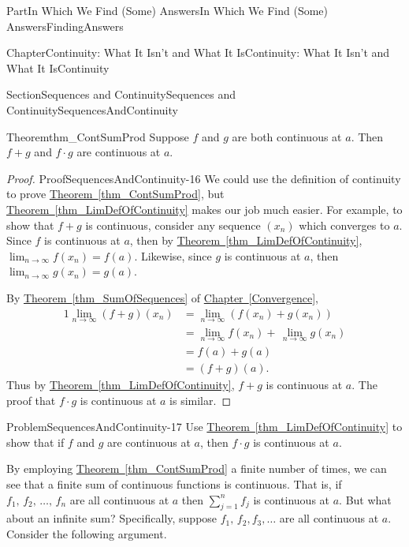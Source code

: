 \documentclass[oneside,10pt,]{book}
\newcommand{\xreffont}{\relax}
\numberwithin{equation}{part}
\newcommand{\amp}{&}
\begin{document}
\begin{partptx}{Part}{In Which We Find (Some) Answers}{}{In Which We Find (Some) Answers}{}{}{FindingAnswers}
\begin{chapterptx}{Chapter}{Continuity: What It Isn't and What It Is}{}{Continuity: What It Isn't and What It Is}{}{}{Continuity}
\begin{sectionptx}{Section}{Sequences and Continuity}{}{Sequences and Continuity}{}{}{SequencesAndContinuity}
\begin{theorem}{Theorem}{}{}{thm_ContSumProd}
 Suppose \(f\) and \(g\) are both continuous at \(a\). Then \(f+g\) and \(f\cdot g\) are continuous at \(a\).%
\end{theorem}
\begin{proof}{Proof}{}{SequencesAndContinuity-16}
We could use the definition of continuity to prove \hyperref[thm_ContSumProd]{Theorem~{\xreffont\ref{thm_ContSumProd}}}, but \hyperref[thm_LimDefOfContinuity]{Theorem~{\xreffont\ref{thm_LimDefOfContinuity}}} makes our job much easier.  For example, to show that \(f+g\) is continuous, consider any sequence \(\left(x_n\right)\) which converges to \(a\).  Since \(f\) is continuous at \(a\), then by \hyperref[thm_LimDefOfContinuity]{Theorem~{\xreffont\ref{thm_LimDefOfContinuity}}}, \(\lim_{n\rightarrow\infty}f(x_n)=f(a)\).  Likewise, since \(g\) is continuous at \(a\), then \(\lim_{n\rightarrow\infty}g(x_n)=g(a)\).%
\par
By \hyperref[thm_SumOfSequences]{Theorem~{\xreffont\ref{thm_SumOfSequences}}} of \hyperref[Convergence]{Chapter~{\xreffont\ref{Convergence}}},\(\)%
\begin{alignat*}{1}
\lim_{n\rightarrow\infty}(f+g)(x_n)\amp=\lim_{n\rightarrow\infty} \left(f(x_n)+g(x_n)\right)\\
\amp =\lim_{n\rightarrow\infty}f(x_n)+\,\lim_{n \rightarrow\infty}g(x_n)\\
\amp =f(a)+g(a)\\
\amp =(f+g)(a).
\end{alignat*}
Thus by \hyperref[thm_LimDefOfContinuity]{Theorem~{\xreffont\ref{thm_LimDefOfContinuity}}}, \(f+g\) is continuous at \(a\).  The proof that \(f\cdot g\) is continuous at \(a\) is similar.%
\end{proof}
\begin{problem}{Problem}{}{SequencesAndContinuity-17}%
Use \hyperref[thm_LimDefOfContinuity]{Theorem~{\xreffont\ref{thm_LimDefOfContinuity}}} to show that if \(f\) and \(g\) are continuous at \(a\), then \(f\cdot g\) is continuous at \(a\).%
\end{problem}
By employing \hyperref[thm_ContSumProd]{Theorem~{\xreffont\ref{thm_ContSumProd}}} a finite number of times, we can see that a finite sum of continuous functions is continuous.  That is, if \(f_1,\,f_2,\,\ldots,\,f_n\) are all continuous at \(a\) then \(\sum_{j=1}^nf_j\) is continuous at \(a\).  But what about an infinite sum?  Specifically, suppose \(f_1,\,f_2,f_3,\ldots\) are all continuous at \(a\). Consider the following argument.%
\par

\end{sectionptx}
\end{chapterptx}
\end{partptx}
\end{document}
